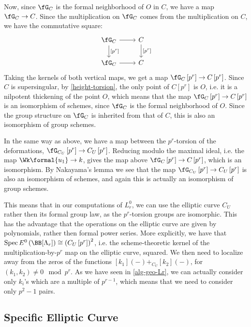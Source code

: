 Now, since $\fG_C$ is the formal neighborhood of $O$ in $C$, we have a map $\fG_C \to C$.
Since the multiplication on $\fG_C$ comes from the multiplication on $C$, we have the commutative square:
$$
\begin{tikzcd}
	\fG_C \arrow{r}{} \arrow{d}{\left[p^r\right]} & C \arrow{d}{\left[p^r\right]} \\
	\fG_C \arrow{r}{} & C
\end{tikzcd}
$$
Taking the kernels of both vertical maps, we get a map $\fG_C\left[p^r\right] \to C\left[p^r\right]$.
Since $C$ is supersingular, by \cref{height-torsion}, the only point of $C\left[p^r\right]$ is $O$, i.e. it is a nilpotent thickening of the point $O$, which means that the map $\fG_C\left[p^r\right] \to C\left[p^r\right]$ is an isomorphism of schemes, since $\fG_C$ is the formal neighborhood of $O$.
Since the group structure on $\fG_C$ is inherited from that of $C$, this is also an isomorphism of group schemes.

In the same way as above, we have a map between the $p^r$-torsion of the deformations, $\fG_{C_U}\left[p^r\right] \to C_U\left[p^r\right]$.
Reducing modulo the maximal ideal, i.e. the map $\Wk\formal{u_1} \to k$, gives the map above $\fG_C\left[p^r\right] \to C\left[p^r\right]$, which is an isomorphism.
By Nakayama's lemma we see that the map $\fG_{C_U}\left[p^r\right] \to C_U\left[p^r\right]$ is also an isomorphism of schemes, and again this is actually an isomorphism of group schemes.

This means that in our computations of $L_r^0$, we can use the elliptic curve $C_U$ rather then its formal group law, as the $p^r$-torsion groups are isomorphic.
This has the advantage that the operations on the elliptic curve are given by polynomials, rather then formal power series.
More explicitly, we have that $\spec E^0\left(\BB[\Lambda_r]\right) \cong \left(C_U\left[p^r\right]\right)^2$, i.e. the scheme-theoretic kernel of the multiplication-by-$p^r$ map on the elliptic curve, squared.
We then need to localize away from the zeros of the functions $[k_1]\left(-\right) +_{C_U} [k_2]\left(-\right)$, for $\left(k_1, k_2\right) \neq 0 \mod p^r$.
As we have seen in \cref{alg-geo-Lr}, we can actually consider only $k_i$'s which are a multiple of $p^{r-1}$, which means that we need to consider only $p^2-1$ pairs.



\subsection{Specific Elliptic Curve}

